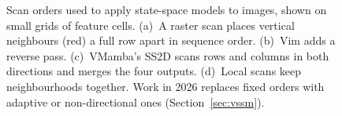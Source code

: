 \begin{figure}[htbp]
\vspace{2mm}
\caption[Scan orders used to apply state-space models to images]{Scan orders
used to apply state-space models to images, shown on small grids of feature
cells. (a)~A raster scan places vertical neighbours (red) a full row apart
in sequence order. (b)~Vim adds a reverse pass. (c)~VMamba's SS2D scans rows
and columns in both directions and merges the four outputs. (d)~Local scans
keep neighbourhoods together. Work in 2026 replaces fixed orders with
adaptive or non-directional ones (Section~\ref{sec:vssm}).}
\label{fig:scans}
\end{figure}
